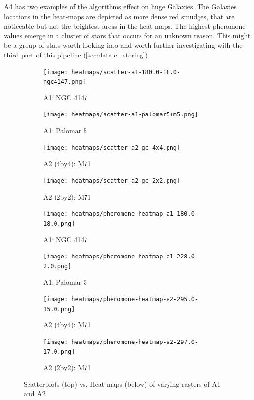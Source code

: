 A4 has two examples of the algorithms effect on huge Galaxies. The Galaxies locations in the heat-maps are depicted as more dense red smudges, that are noticeable but not the brightest areas in the heat-maps. The highest pheromone values emerge in a cluster of stars that occurs for an unknown reason. This might be a group of stars worth looking into and worth further investigating with the third part of this pipeline (\ref{sec:data-clustering})



\begin{figure}[H]
    \centering
    \begin{subfigure}[b]{0.24\textwidth}
        \texttt{[image: heatmaps/scatter-a1-180.0-18.0-ngc4147.png]}
        \caption{\label{fig:scatter-ngc4147} A1: NGC 4147}
    \end{subfigure}
    \begin{subfigure}[b]{0.24\textwidth}
        \texttt{[image: heatmaps/scatter-a1-palomar5+m5.png]}
        \caption{\label{fig:scatter-palomar5} A1: Palomar 5}
    \end{subfigure}
    \begin{subfigure}[b]{0.24\textwidth}
        \texttt{[image: heatmaps/scatter-a2-gc-4x4.png]}
        \caption{\label{fig:scatter-M71-dog-4b4}A2 (4by4): M71}
    \end{subfigure}
    \begin{subfigure}[b]{0.24\textwidth}
        \texttt{[image: heatmaps/scatter-a2-gc-2x2.png]}
        \caption{\label{fig:scatter-M71-dog-2b2}A2 (2by2): M71}
    \end{subfigure}
    \begin{subfigure}[b]{0.24\textwidth}
        \texttt{[image: heatmaps/pheromone-heatmap-a1-180.0-18.0.png]}
        \caption{\label{fig:heat-ngc4147} A1: NGC 4147}
    \end{subfigure}
    \begin{subfigure}[b]{0.24\textwidth}
        \texttt{[image: heatmaps/pheromone-heatmap-a1-228.0--2.0.png]}
        \caption{\label{fig:heat-palomar5} A1: Palomar 5}
    \end{subfigure}
    \begin{subfigure}[b]{0.24\textwidth}
        \texttt{[image: heatmaps/pheromone-heatmap-a2-295.0-15.0.png]}
        \caption{\label{fig:heat-M71-dog-4b4}A2 (4by4): M71}
    \end{subfigure}
    \begin{subfigure}[b]{0.24\textwidth}
        \texttt{[image: heatmaps/pheromone-heatmap-a2-297.0-17.0.png]}
        \caption{\label{fig:heat-M71-dog-2by2}A2 (2by2): M71}
    \end{subfigure}
    \caption{\label{fig:scatterplot-heatmaps-A12} Scatterplots (top) vs. Heat-maps (below) of varying rasters of A1 and A2}
\end{figure}



